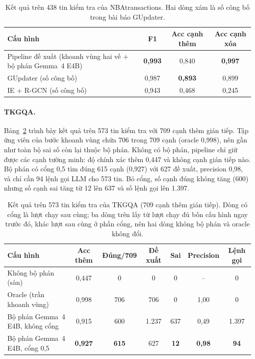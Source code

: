 \begin{table}[htbp]
\centering
\caption{Kết quả trên 438 tin kiểm tra của NBAtransactions. Hai dòng xám là số công bố trong bài báo GUpdater.}\label{tab:nba}
\small
\begin{tabular}{>{\raggedright\arraybackslash}p{7.2cm} c c c}
\toprule
\textbf{Cấu hình} & \textbf{F1} & \textbf{Acc cạnh thêm} & \textbf{Acc cạnh xóa} \\
\midrule
\rowcolor{green!10}
Pipeline đề xuất (khoanh vùng hai vế + bộ phán Gemma~4 E4B) & \textbf{0,993} & 0,840 & \textbf{0,997} \\
\midrule
\rowcolor{gray!15}
GUpdater (số công bố) & 0,987 & \textbf{0,893} & 0,899 \\
\rowcolor{gray!15}
IE + R-GCN (số công bố) & 0,943 & 0,468 & 0,245 \\
\bottomrule
\end{tabular}
\end{table}

\paragraph*{TKGQA.}
Bảng~\ref{tab:tkgqa} trình bày kết quả trên 573 tin kiểm tra với 709 cạnh thêm gián tiếp.
Tập ứng viên của bước khoanh vùng chứa 706 trong 709 cạnh (oracle 0,998), nên gần như toàn bộ sai số còn lại thuộc bộ phán.
Không có bộ phán, pipeline chỉ giữ được các cạnh tường minh: độ chính xác thêm 0,447 và không cạnh gián tiếp nào.
Bộ phán có cổng 0,5 tìm đúng 615 cạnh (0,927) với 627 đề xuất, precision 0,98, và chỉ cần 94 lệnh gọi LLM cho 573 tin.
Bỏ cổng, số cạnh đúng không tăng (600) nhưng số cạnh sai tăng từ 12 lên 637 và số lệnh gọi lên 1.397.

\begin{table}[htbp]
\centering
\caption{Kết quả trên 573 tin kiểm tra của TKGQA (709 cạnh thêm gián tiếp). Dòng có cổng là lượt chạy sau cùng; ba dòng trên lấy từ lượt chạy đủ bốn cấu hình ngay trước đó, khác lượt sau cùng ở phần cổng, nên hai dòng không bộ phán và oracle không đổi.}\label{tab:tkgqa}
\small
\begin{tabular}{>{\raggedright\arraybackslash}p{4.6cm} c c c c c c}
\toprule
\textbf{Cấu hình} & \textbf{Acc thêm} & \textbf{Đúng/709} & \textbf{Đề xuất} & \textbf{Sai} & \textbf{Precision} & \textbf{Lệnh gọi} \\
\midrule
Không bộ phán (sàn) & 0,447 & 0 & 0 & 0 & -- & 0 \\
Oracle (trần khoanh vùng) & 0,998 & 706 & 706 & 0 & 1,00 & 0 \\
Bộ phán Gemma~4 E4B, không cổng & 0,915 & 600 & 1.237 & 637 & 0,49 & 1.397 \\
\rowcolor{green!10}
Bộ phán Gemma~4 E4B, cổng 0,5 & \textbf{0,927} & \textbf{615} & 627 & \textbf{12} & \textbf{0,98} & \textbf{94} \\
\bottomrule
\end{tabular}
\end{table}

